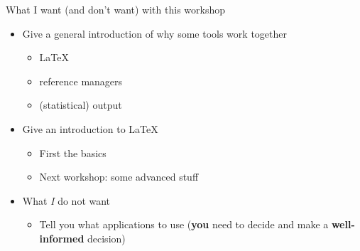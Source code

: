 \documentclass[ignorenonframetext]{beamer}
\begin{document}
\begin{frame}{What I want (and don't want) with this workshop}

\begin{itemize}
\item
  Give a general introduction of why some tools work together

  \begin{itemize}
  \item \LaTeX{}
  \item reference managers
  \item (statistical) output
  \end{itemize}
\item
  Give an introduction to \LaTeX{}

  \begin{itemize}
  \item
    First the basics
  \item
    Next workshop: some advanced stuff
  \end{itemize}
\item
  What \emph{I} do not want

  \begin{itemize}
  \item
    Tell you what applications to use (\textbf{you} need to decide and make a \textbf{well-informed} decision)
  \end{itemize}
\end{itemize}

\end{frame}
\end{document}
